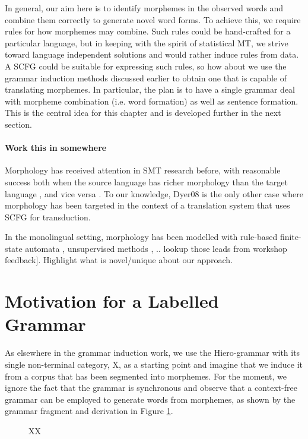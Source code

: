 In general, our aim here is to identify morphemes in the observed words and combine them correctly to generate novel word forms.
To achieve this, we require rules for how morphemes may combine.
Such rules could be hand-crafted for a particular language, but in keeping with the spirit of statistical MT, we strive toward language independent solutions and would rather induce rules from data.
A SCFG could be suitable for expressing such rules, so how about we use the grammar induction methods discussed earlier to obtain one that is capable of translating morphemes.
In particular, the plan is to have a single grammar deal with morpheme combination (i.e. word formation) as well as sentence formation.
This is the central idea for this chapter and is developed further in the next section.

\paragraph{Work this in somewhere}
Morphology has received attention in SMT research before, with reasonable success both
 when the source language has richer morphology than the target language \citep{Yang2006,Dyer2008}, 
 and vice versa \citep{someone,Yeniterzi2010} .
To our knowledge, Dyer08 is the only other case where morphology has been targeted in the context of a translation system that uses SCFG for transduction.

In the monolingual setting, morphology has been modelled with 
rule-based finite-state automata \citep{someone}, 
unsupervised methods \citep{Creutz2006,Goldsmith2001},
 .. lookup those leads from workshop feedback]. Highlight what is novel/unique about our approach.

\section{Motivation for a Labelled Grammar}
As elsewhere in the grammar induction work, we use the Hiero-grammar with its single non-terminal category, X, as a starting point and imagine that we induce it from a corpus that has been segmented into morphemes.
For the moment, we ignore the fact that the grammar is synchronous and observe that a context-free grammar can be employed to generate words from morphemes, as shown by the grammar fragment and derivation in Figure \ref{fig:unlabelled_word_derivation1}.


\begin{figure}[h]
 \centering
 \hspace{10mm}
 \caption{XX}
 \label{fig:unlabelled_word_derivation1}
\end{figure}

